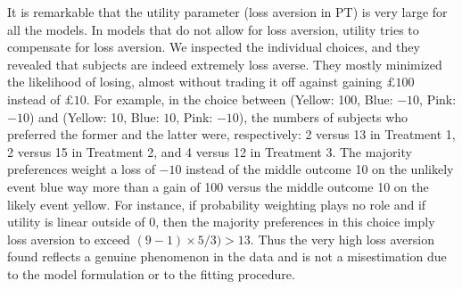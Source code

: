 \documentclass[11pt, a4paper, oneside,final,notitlepage,onecolumn]{article}\usepackage[]{graphicx}\usepackage[]{color}
\begin{document}
It is remarkable that the utility parameter (loss aversion in PT) is very large for all the models. In models that do not allow for loss aversion, utility tries to compensate for loss aversion. We inspected the individual choices, and they revealed that subjects are indeed extremely loss averse.  They mostly minimized the likelihood of losing, almost without trading it off against gaining $\pounds 100$ instead of $\pounds 10$.  For example, in the choice between (Yellow: 100, Blue: $-10$, Pink: $-10$) and (Yellow: 10, Blue: $10$, Pink: $-10$), the numbers of subjects who preferred the former and the latter were, respectively: 2 versus 13 in Treatment 1, 2 versus 15 in Treatment 2, and 4 versus 12 in Treatment 3.  The majority preferences weight a loss of $-10$ instead of the middle outcome 10 on the unlikely event blue way more than a gain of 100 versus the middle outcome 10 on the likely event yellow.
For instance, if probability weighting plays no role and if utility is linear outside of $0$, then the majority preferences in this choice imply loss aversion to exceed $(9-1) \times 5/3) > 13$.  Thus the very high loss aversion found reflects a genuine phenomenon in the data and is not a misestimation due to the model formulation or to the fitting procedure.
\end{document}

